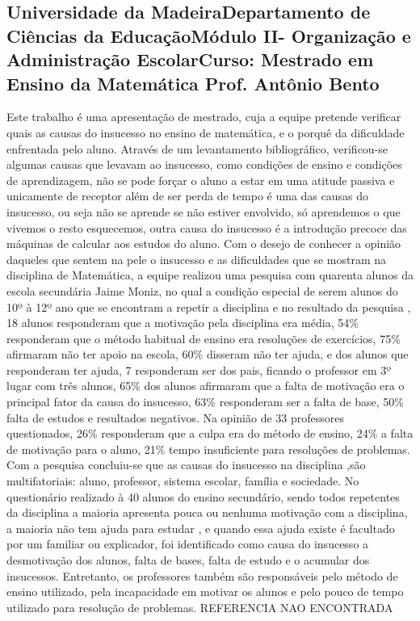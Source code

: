 \documentclass[12pt,a4paper]{article}
\begin{document}
\subsection{Universidade da MadeiraDepartamento de Ciências da EducaçãoMódulo  II- Organização e Administração EscolarCurso: Mestrado em Ensino da Matemática Prof. Antônio Bento}
Este trabalho é uma apresentação de mestrado, cuja a equipe pretende verificar quais as causas do insucesso no ensino de matemática, e o porquê da dificuldade enfrentada pelo aluno. 
 Através de um levantamento bibliográfico, verificou-se algumas causas que levavam ao insucesso, como condições de ensino e condições de aprendizagem, não se pode forçar o aluno a estar em uma atitude passiva e unicamente de receptor além de ser perda de tempo é uma das causas do insucesso, ou seja não se aprende se não estiver envolvido, só aprendemos o que vivemos o resto esquecemos, outra causa do insucesso é a introdução precoce das máquinas de calcular aos estudos do aluno.
Com o desejo de conhecer a opinião daqueles que sentem na pele o insucesso e as dificuldades que se mostram na disciplina de Matemática, a equipe realizou uma pesquisa com quarenta alunos da escola secundária Jaime Moniz, no qual a condição especial de serem alunos do 10º à 12º ano que se encontram a repetir a disciplina e no resultado da pesquisa , 18 alunos responderam que a motivação pela disciplina era média, 54\% responderam que o método habitual de ensino era resoluções de exercícios, 75\% afirmaram não ter apoio na escola, 60\% disseram não ter ajuda, e dos alunos que responderam ter ajuda, 7 responderam ser dos pais, ficando o professor em 3º lugar com três alunos, 65\% dos alunos afirmaram que a falta de motivação era o principal fator da causa do insucesso, 63\%  responderam ser a falta de base, 50\% falta de estudos e resultados negativos. 
Na opinião de 33 professores questionados, 26\% responderam que a culpa era do método de ensino, 24\% a falta de motivação para o aluno, 21\% tempo insuficiente para resoluções de problemas. 
Com a pesquisa concluiu-se que as causas do insucesso na disciplina ,são multifatoriais: aluno, professor, sistema escolar, família e sociedade. No questionário realizado à 40 alunos do ensino secundário, sendo todos repetentes da disciplina a maioria apresenta pouca ou nenhuma motivação com a disciplina, a maioria não tem ajuda para estudar , e quando essa ajuda existe é facultado por um familiar ou explicador, foi identificado como causa do insucesso a desmotivação dos alunos, falta de bases, falta de estudo e o acumular dos insucessos. Entretanto, os professores também são responsáveis pelo método de ensino utilizado, pela incapacidade em motivar os alunos e pelo pouco de tempo utilizado para resolução de problemas. REFERENCIA NAO ENCONTRADA
\end{document}
